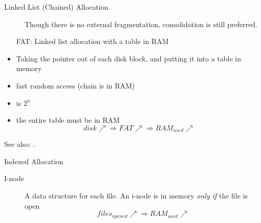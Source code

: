 \begin{frame}
  \begin{description}
  \item[Linked List (Chained) Allocation] Though there is no external fragmentation,
    consolidation is still preferred.
  \end{description}
  \begin{center}
  \end{center}
\end{frame}

\begin{frame}
  \begin{itemize}
  \item[FAT:] Linked list allocation with a table in RAM
  \end{itemize}
  \begin{minipage}{.59\textwidth}
    \begin{block}{}
      \begin{itemize}
      \item Taking the pointer out of each disk block, and putting it into a table in
        memory
      \item fast random access (chain is in RAM)
      \item is $2^n$
      \item the entire table must be in RAM
        $$disk\nearrow{}\Rightarrow FAT\nearrow{}\Rightarrow RAM_{used}\nearrow$$
      \end{itemize}
    \end{block}
  \end{minipage}\quad
  \begin{minipage}{.35\textwidth}
  \end{minipage}
\end{frame}

See also: .

\begin{frame}{Indexed Allocation}
  \begin{center}
  \end{center}
  \begin{description}
  \item[I-node] A data structure for each file. An i-node is in memory \emph{only if} the
    file is open
    $$files_{opened}\nearrow{}\Rightarrow{}RAM_{used}\nearrow{}$$
  \end{description}
\end{frame}

